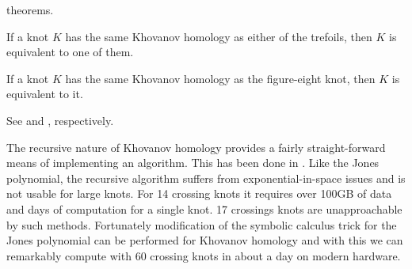     theorems.
    \begin{theorem}
        If a knot $K$ has the same Khovanov homology as either of the
        trefoils, then $K$ is equivalent to one of them.
    \end{theorem}
    \begin{theorem}
        If a knot $K$ has the same Khovanov homology as the figure-eight
        knot, then $K$ is equivalent to it.
    \end{theorem}
    See \cite{BaldwinSivekKhovanovTrefoils} and
    \cite{BaldwinDowlinKhovanovFigureEight}, respectively.
    \par\hfill\par
    The recursive nature of Khovanov homology provides a fairly
    straight-forward means of implementing an algorithm. This has been done in
    \cite{sage}. Like the Jones polynomial, the recursive algorithm suffers
    from exponential-in-space issues and is not usable for large knots.
    For 14 crossing knots it requires over
    100GB of data and days of computation for a single knot. 17 crossings
    knots are unapproachable by such methods. Fortunately modification of the
    symbolic calculus trick for the Jones polynomial can be performed for
    Khovanov homology \cite{BarNatan2006FASTKH} and with this we can
    remarkably compute with 60 crossing knots in about a day on modern hardware.
